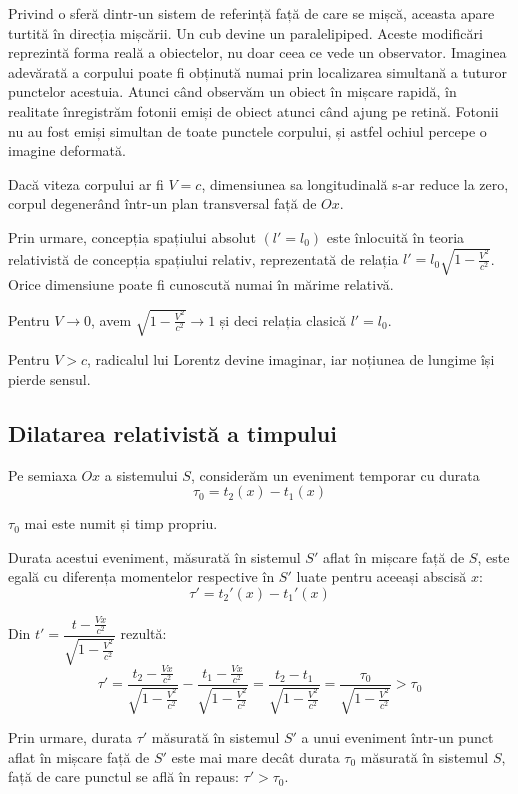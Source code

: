 \documentclass[a4paper, 12pt]{article}
\newcommand{\lorentzradical}{\sqrt{1 - \frac{V^2}{c^2}}}
\begin{document}
Privind o sferă dintr-un sistem de referință față de care se mișcă, aceasta
apare turtită în direcția mișcării. Un cub devine un paralelipiped.
Aceste modificări reprezintă forma reală a obiectelor, nu doar ceea ce vede
un observator. Imaginea adevărată a corpului poate fi obținută numai prin
localizarea simultană a tuturor punctelor acestuia. Atunci când observăm un
obiect în mișcare rapidă, în realitate înregistrăm fotonii emiși de obiect
atunci când ajung pe retină. Fotonii nu au fost emiși simultan de toate punctele
corpului, și astfel ochiul percepe o imagine deformată.

Dacă viteza corpului ar fi \( V = c \), dimensiunea sa longitudinală s-ar reduce
la zero, corpul degenerând într-un plan transversal față de $Ox$.

Prin urmare, concepția spațiului absolut \( \left( l' = l_0 \right) \) este
înlocuită în teoria relativistă de concepția spațiului relativ, reprezentată
de relația \( l' = l_0 \lorentzradical \). Orice dimensiune poate fi cunoscută
numai în mărime relativă.

Pentru \( V \rightarrow 0 \), avem \( \lorentzradical \rightarrow 1 \) și deci
relația clasică \( l' = l_0 \).

Pentru \( V > c \), radicalul lui Lorentz devine imaginar, iar noțiunea de lungime
își pierde sensul.

\subsection{Dilatarea relativistă a timpului}
Pe semiaxa $Ox$ a sistemului $S$, considerăm un eveniment temporar cu durata
\[ \tau_0 = t_2(x) - t_1(x) \]

$\tau_0$ mai este numit și timp propriu.

Durata acestui eveniment, măsurată în sistemul $S'$ aflat în mișcare față de
$S$, este egală cu diferența momentelor respective în $S'$ luate pentru aceeași
abscisă $x$:
\[ \tau' = t_2'(x) - t_1'(x) \]

Din \( t' = \dfrac{t - \frac{Vx}{c^2}}{\lorentzradical} \) rezultă:
\[
    \tau'
    = \frac{t_2 - \frac{Vx}{c^2}}{\lorentzradical}
    - \frac{t_1 - \frac{Vx}{c^2}}{\lorentzradical}
    = \frac{t_2 - t_1}{\lorentzradical} = \frac{\tau_0}{\lorentzradical} > \tau_0
\]

Prin urmare, durata $\tau'$ măsurată în sistemul $S'$ a unui eveniment într-un
punct aflat în mișcare față de $S'$ este mai mare decât durata $\tau_0$
măsurată în sistemul $S$, față de care punctul se află în repaus:
\( \tau' > \tau_0 \).
\end{document}
